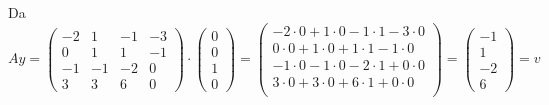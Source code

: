 \documentclass[12pt]{article}
\begin{document}
\begin{enumerate}[(a)]
Da
$$
Ay = \left(\begin{array}{cccc}
-2&1&-1&-3\\
0&1&1&-1\\
-1&-1&-2&0\\
3&3&6&0
\end{array}\right) \cdot
\left(\begin{array}{c}
0\\
0\\
1\\
0
\end{array}\right)=
\left(\begin{array}{c}
-2 \cdot 0 + 1 \cdot 0 - 1 \cdot 1 -3 \cdot 0\\
0 \cdot 0 + 1 \cdot 0 + 1 \cdot 1 -1 \cdot 0\\
-1 \cdot 0 - 1 \cdot 0 -2 \cdot 1 + 0 \cdot 0\\
3 \cdot 0 + 3 \cdot 0 + 6 \cdot 1 + 0 \cdot 0\\ 
\end{array}\right)=
\left(\begin{array}{cc|c}
-1\\
1\\
-2\\
6
\end{array}\right) = v
$$


\end{enumerate}
\end{document}
